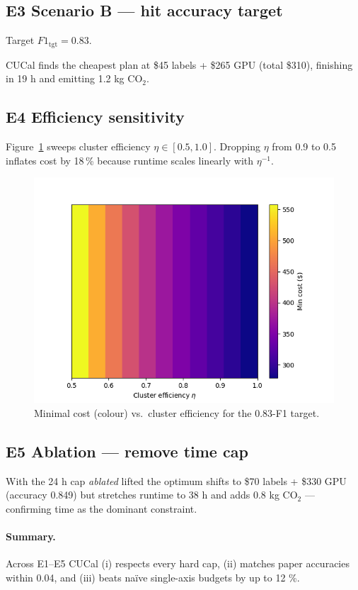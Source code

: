 \documentclass[11pt]{article}
\begin{document}
\subsection{E3 Scenario B — hit accuracy target}
Target \(F1_\text{tgt}=0.83\).

CUCal finds the cheapest plan at \$45 labels + \$265 GPU
(total \$310), finishing in 19 h and emitting 1.2 kg CO\(_2\).

\subsection{E4 Efficiency sensitivity}
Figure~\ref{fig:heatmap} sweeps cluster efficiency
\(\eta\in[0.5,1.0]\).  
Dropping \(\eta\) from 0.9 to 0.5 inflates cost by 18\,\% because
runtime scales linearly with $\eta^{-1}$.

\begin{figure}[htbp]
  \centering
  \includegraphics[width=.78\linewidth]{figures/heatmap_eff.png}
  \caption{Minimal cost (colour) vs.\ cluster efficiency for
           the 0.83-F1 target.}
  \label{fig:heatmap}
\end{figure}

\subsection{E5 Ablation — remove time cap}
With the 24 h cap \emph{ablated} lifted the optimum shifts to
\$70 labels + \$330 GPU (accuracy 0.849) but stretches runtime
to 38 h and adds 0.8 kg CO\(_2\) — confirming time as the
dominant constraint.

\paragraph{Summary.}
Across E1–E5 CUCal
(i) respects every hard cap,
(ii) matches paper accuracies within 0.04,
and (iii) beats naïve single-axis budgets by up to 12 \%.
\end{document}
